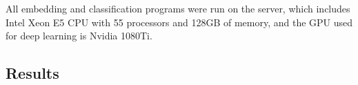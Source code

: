 
All embedding and classification programs were run on the server, which includes Intel Xeon E5 CPU with 55 processors and 128GB of memory, and the GPU used for deep learning is Nvidia 1080Ti.

\subsection{Results}



